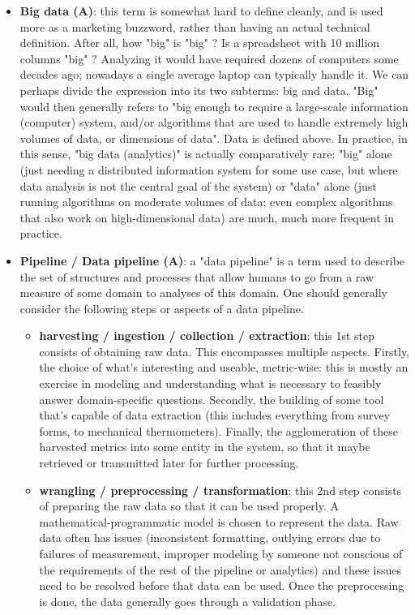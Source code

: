 \documentclass{article}
\begin{document}
\begin{itemize}
	\item \textbf{Big data (A)}: this term is somewhat hard to define cleanly, and is used more as a marketing buzzword, rather than having an actual technical definition. After all, how "big" is "big" ? Is a spreadsheet with 10 million columns "big" ? Analyzing it would have required dozens of computers some decades ago; nowadays a single average laptop can typically handle it. We can perhaps divide the expression into its two subterms: big and data. "Big" would then generally refers to "big enough to require a large-scale information (computer) system, and/or algorithms that are used to handle extremely high volumes of data, or dimensions of data". Data is defined above. In practice, in this sense, "big data (analytics)" is actually comparatively rare: "big" alone (just needing a distributed information system for some use case, but where data analysis is not the central goal of the system) or "data" alone (just running algorithms on moderate volumes of data; even complex algorithms that also work on high-dimensional data) are much, much more frequent in practice.

	\item \textbf{Pipeline / Data pipeline (A)}: a "data pipeline" is a term used to describe the set of structures and processes that allow humans to go from a raw measure of some domain to analyses of this domain. One should generally consider the following steps or aspects of a data pipeline.
	\begin{itemize}
		\item \textbf{harvesting / ingestion / collection / extraction}: this 1st step consists of obtaining raw data. This encompasses multiple aspects. Firstly, the choice of what's interesting and useable, metric-wise: this is mostly an exercise in modeling and understanding what is necessary to feasibly answer domain-specific questions. Secondly, the building of some tool that's capable of data extraction (this includes everything from survey forms, to mechanical thermometers). Finally, the agglomeration of these harvested metrics into some entity in the system, so that it maybe retrieved or transmitted later for further processing.

		\item \textbf{wrangling / preprocessing / transformation}: this 2nd step consists of preparing the raw data so that it can be used properly. A mathematical-programmatic model is chosen to represent the data. Raw data often has issues (inconsistent formatting, outlying errors due to failures of measurement, improper modeling by someone not conscious of the requirements of the rest of the pipeline or analytics) and these issues need to be resolved before that data can be used. Once the preprocessing is done, the data generally goes through a validation phase.


\end{itemize}
\end{itemize}
\end{document}
